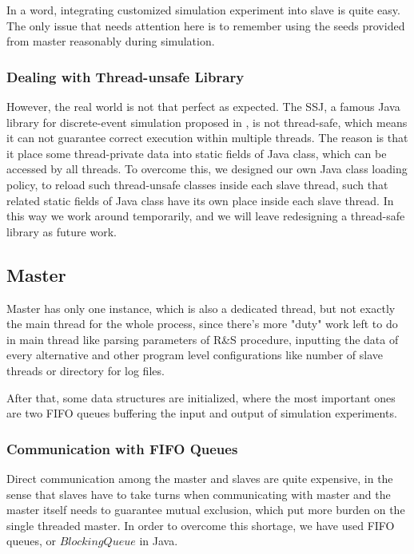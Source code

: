 In a word, integrating customized simulation experiment into slave is quite easy. The only issue that needs attention here is to remember using the seeds provided from master reasonably during simulation.

\subsubsection{Dealing with Thread-unsafe Library}

However, the real world is not that perfect as expected. The SSJ, a famous Java library for discrete-event simulation proposed in \cite{ssj}, is not thread-safe, which means it can not guarantee correct execution within multiple threads. The reason is that it place some thread-private data into static fields of Java class, which can be accessed by all threads. To overcome this, we designed our own Java class loading policy, to reload such thread-unsafe classes inside each slave thread, such that related static fields of Java class have its own place inside each slave thread. In this way we work around temporarily, and we will leave redesigning a thread-safe library as future work.

\subsection{Master}

Master has only one instance, which is also a dedicated thread, but not exactly the main thread for the whole process, since there's more "duty" work left to do in main thread like parsing parameters of R\&S procedure, inputting the data of every alternative and other program level configurations like number of slave threads or directory for log files.

After that, some data structures are initialized, where the most important ones are two FIFO queues buffering the input and output of simulation experiments.

\subsubsection{Communication with FIFO Queues}

Direct communication among the master and slaves are quite expensive, in the sense that slaves have to take turns when communicating with master and the master itself needs to guarantee mutual exclusion, which put more burden on the single threaded master. In order to overcome this shortage, we have used FIFO queues, or $BlockingQueue$ in Java.

